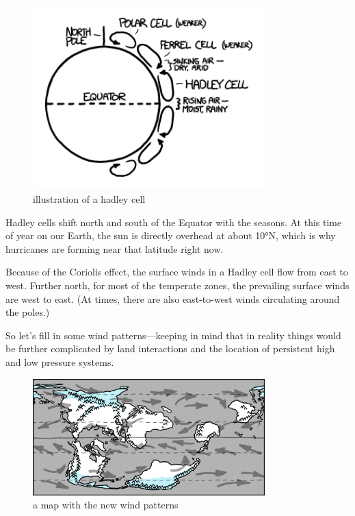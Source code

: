 \begin{figure}[!htbp]
\centering
\includegraphics[scale=0.5, max width=0.8\textwidth]{imgs/a/10/cassini_hadley.png}
\caption{illustration of a hadley cell}
\end{figure}

{Hadley cells shift north and south of the Equator with the seasons. At this time of year on our Earth, the sun is directly overhead at about 10°N, which is why hurricanes are forming near that latitude right now.}

{Because of the Coriolis effect, the surface winds in a Hadley cell flow from east to west. Further north, for most of the temperate zones, the prevailing surface winds are west to east. (At times, there are also east-to-west winds circulating around the poles.)}

{So let’s fill in some wind patterns—keeping in mind that in reality things would be further complicated by land interactions and the location of persistent high and low pressure systems.}

\begin{figure}[!htbp]
\centering
\includegraphics[scale=0.5, max width=0.8\textwidth]{imgs/a/10/cassini_tradewinds.png}
\caption{a map with the new wind patterns}
\end{figure}

